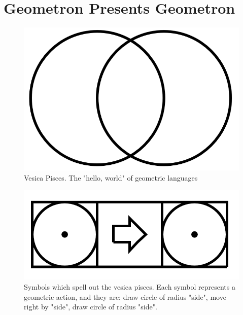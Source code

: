 \documentclass[11pt]{book}
\begin{document}
\section{
Geometron Presents Geometron}

\begin{figure}

\includegraphics[width=\linewidth]{../figures/vesica.png}

\caption{Vesica Pisces.  The "hello, world" of geometric languages}
\end{figure}


\begin{figure}

\includegraphics[width=\linewidth]{../figures/vesicacode.png}

\caption{Symbols which spell out the vesica pisces. Each symbol represents a geometric action, and they are: draw circle of radius "side", move right by "side", draw circle of radius "side".}
\end{figure}
\end{document}
